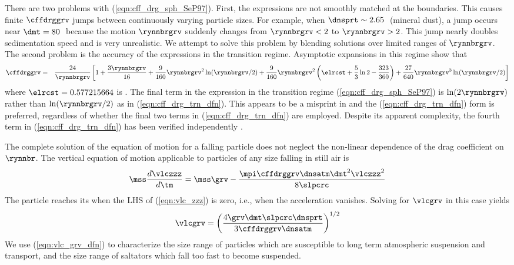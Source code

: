 \documentclass[12pt,twoside]{book}
\begin{document}
There are two problems with (\ref{eqn:cff_drg_sph_SeP97}).
First, the expressions are not smoothly matched at the boundaries.
This causes finite $\cffdrggrv$ jumps between continuously varying
particle sizes.
For example, when $\dnsprt \sim 2.65$\,\gxcmC\ (mineral dust), a jump
occurs near $\dmt = 80$\,\um\ because the motion $\rynnbrgrv$ suddenly
changes from $\rynnbrgrv < 2$ to $\rynnbrgrv > 2$.  
This jump nearly doubles sedimentation speed and is very unrealistic.
We attempt to solve this problem by blending solutions over limited
ranges of $\rynnbrgrv$. 
The second problem is the accuracy of the expressions in the
transition regime.
Asymptotic expansions in this regime \cite[]{PrP57,ChB69,PrK78,PrK98}
show that 
\begin{eqnarray}
\cffdrggrv & = &
\frac{24}{\rynnbrgrv} \left[ 1 + \frac{3 \rynnbrgrv}{16} 
+ \frac{9}{160} \rynnbrgrv^{2} \ln (\rynnbrgrv / 2) 
+ \frac{9}{160} \rynnbrgrv^{2} \left( 
\elrcst + \frac{5}{3} \ln 2 - \frac{323}{360} \right)
+ \frac{27}{640} \rynnbrgrv^{3} \ln (\rynnbrgrv / 2) 
\right]
\label{eqn:cff_drg_trn_dfn}
\end{eqnarray}
where $\elrcst = 0.577215664$ is .
The final term in the \cite{SeP97} expression in the transition
regime (\ref{eqn:cff_drg_sph_SeP97}) is $\ln(2\rynnbrgrv)$ rather than
$\ln(\rynnbrgrv/2)$ as in (\ref{eqn:cff_drg_trn_dfn}). 
This appears to be a misprint in \citeauthor{SeP97} and the
(\ref{eqn:cff_drg_trn_dfn}) form is preferred, regardless of whether
the final two terms in (\ref{eqn:cff_drg_trn_dfn}) are employed. 
Despite its apparent complexity, the fourth term in
(\ref{eqn:cff_drg_trn_dfn}) has been verified independently
\cite[]{PrK98}.

The complete solution of the equation of motion for a falling particle 
does not neglect the non-linear dependence of the drag coefficient on
$\rynnbr$. 
The vertical equation of motion applicable to particles of any size
falling in still air is
\begin{equation}
\mss \frac{d \vlczzz}{d \tm } = \mss \grv - 
\frac{\mpi \cffdrggrv \dnsatm \dmt^{2} \vlczzz^{2}}{8 \slpcrc }
\label{eqn:vlc_zzz}
\end{equation}
The particle reaches its  when the LHS of
(\ref{eqn:vlc_zzz}) is zero, i.e., when the acceleration vanishes.
Solving for $\vlcgrv$ in this case yields
\begin{equation}
\vlcgrv = \left( \frac{4 \grv \dmt \slpcrc \dnsprt
}{ 3 \cffdrggrv \dnsatm } \right)^{1/2}
\label{eqn:vlc_grv_dfn}
\end{equation}
We use (\ref{eqn:vlc_grv_dfn}) to characterize the size range of 
particles which are susceptible to long term atmospheric suspension
and transport, and the size range of saltators which fall too fast to
become suspended.
\end{document}
